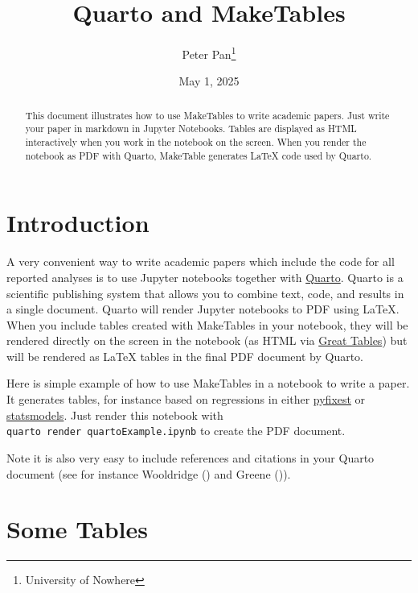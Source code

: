 \documentclass[
  11pt,
  a4paper,
  DIV=11,
  numbers=noendperiod]{scrartcl}
\title{Quarto and MakeTables}
\author{Peter Pan\footnote{University of Nowhere}}
\date{May 1, 2025}
\begin{document}
\maketitle
\begin{abstract}
This document illustrates how to use MakeTables to write academic
papers. Just write your paper in markdown in Jupyter Notebooks. Tables
are displayed as HTML interactively when you work in the notebook on the
screen. When you render the notebook as PDF with Quarto, MakeTable
generates LaTeX code used by Quarto.

\newpage
\end{abstract}


\onehalfspacing

\section{Introduction}\label{introduction}

A very convenient way to write academic papers which include the code
for all reported analyses is to use Jupyter notebooks together with
\href{https://quarto.org/}{Quarto}. Quarto is a scientific publishing
system that allows you to combine text, code, and results in a single
document. Quarto will render Jupyter notebooks to PDF using LaTeX. When
you include tables created with MakeTables in your notebook, they will
be rendered directly on the screen in the notebook (as HTML via
\href{https://posit-dev.github.io/great-tables/articles/intro.html}{Great
Tables}) but will be rendered as LaTeX tables in the final PDF document
by Quarto.

Here is simple example of how to use MakeTables in a notebook to write a
paper. It generates tables, for instance based on regressions in either
\href{https://py-econometrics.github.io/pyfixest/pyfixest.html}{pyfixest}
or \href{https://www.statsmodels.org/stable/index.html}{statsmodels}.
Just render this notebook with
\texttt{quarto\ render\ quartoExample.ipynb} to create the PDF document.

Note it is also very easy to include references and citations in your
Quarto document (see for instance Wooldridge
() and Greene
()).

\section{Some Tables}\label{some-tables}
\end{document}
